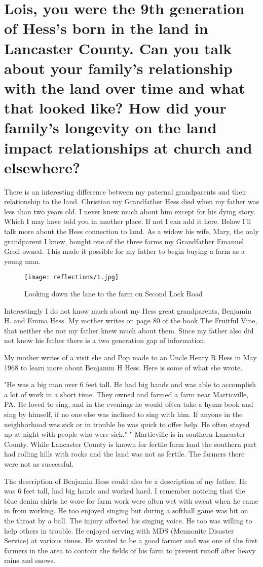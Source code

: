 \section{Lois, you were the 9th generation of Hess's born in the land in Lancaster County.
Can you talk about your family's relationship with the land over time and what that looked like? How did your family's longevity on the land impact relationships at church and elsewhere?}
There is an interesting difference between my paternal grandparents and their relationship to the land.
Christian my Grandfather Hess died when my father was less than two years old.
I never knew much about him except for his dying story.
Which I may have told you in another place.
If not I can add it here.
Below I'll talk more about the Hess connection to land.
As a widow his wife, Mary, the only grandparent I knew, bought one of the three farms my Grandfather Emanuel Groff owned.
This made it possible for my father to begin buying a farm as a young man.

\begin{figure}
\centering
\texttt{[image: reflections/1.jpg]}
\caption{
Looking down the lane to the farm on Second Lock Road
}
\end{figure}

Interestingly I do not know much about my Hess great grandparents, Benjamin H.
and Emma Hess.
My mother writes on page 80 of the book The Fruitful Vine, that neither she nor my father knew much about them.
Since my father also did not know his father there is a two generation gap of information.

My mother writes of a visit she and Pop made to an Uncle Henry R Hess in May 1968 to learn more about Benjamin H Hess.
Here is some of what she wrote.

      "He was a big man over 6 feet tall.
He had big hands and was able to accomplish a lot of work in a short time.
They owned and farmed a farm near Marticville, PA.
He loved to sing, and in the evenings he would often take a hymn book and sing by himself, if no one else was inclined to sing with him.
If anyone in the neighborhood was sick or in trouble he was quick to offer help.
He often stayed up at night with people who were sick."
"
Marticville is in southern Lancaster County.
While Lancaster County is known for fertile farm land the southern part had rolling hills with rocks and the land was not as fertile.
The farmers there were not as successful.

The description of Benjamin Hess could also be a description of my father.
He was 6 feet tall, had big hands and worked hard.
I remember noticing that the blue denim shirts he wore for farm work were often wet with sweat when he came in from working.
He too enjoyed singing but during a softball game was hit on the throat by a ball.
The injury affected his singing voice.
He too was willing to help others in trouble.
He enjoyed serving with MDS (Mennonite Disaster Service) at various times.
He wanted to be a good farmer and was one of the first farmers in the area to contour the fields of his farm to prevent runoff after heavy rains and snows.

